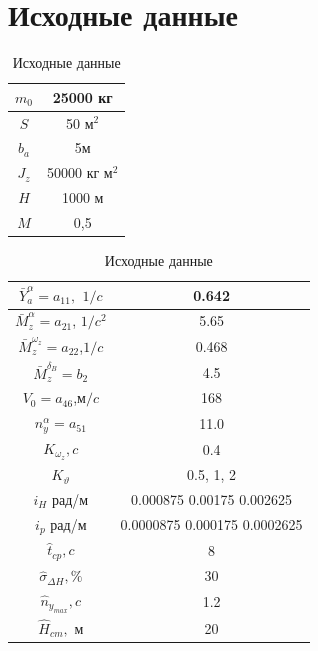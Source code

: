 \documentclass[a4paper,12pt]{article}
\begin{document}
\section{Исходные данные}

    \begin{table}[H]
        \centering
        \caption{Исходные данные}
        \label{tab:Исходные данные 1}
        \begin{tabular}{|c|c|}
        \hline
            $m_0$ & 25000 кг  \\ \hline
            $S$ & 50 м$^2$ \\ \hline
            $b_a$ & 5м  \\ \hline
            $J_z$ & 50000 кг м$^2$ \\ \hline
            $H$ & 1000 м  \\ \hline
            $M$ & 0,5  \\ \hline
        \end{tabular}
    \end{table}
                                
    \begin{table}[H]
        \centering
        \caption{Исходные данные}
        \label{tab:Исходные данные 2}
        \begin{tabular}{|c|c|}
            \hline
            $\bar{Y}_a^\alpha=a_{11},$ $1/c$ &  0.642  \\ \hline
            $\bar{M}_z^{\alpha}=a_{21}$, $1/c^2$ &   5.65 \\ \hline
            $\bar{M}_z^{\omega_z}=a_{22}$,$1/c$ &  0.468 \\ \hline
            $\bar{M}^{\delta_B}_z=b_2$ & 4.5  \\ \hline
            $V_0=a_{46}$,м$/c$ & 168 \\ \hline
            $n_y^\alpha=a_{51}$ &  11.0  \\ \hline
            $K_{\omega_z}, c$ & 0.4 \\ \hline
            $K_\vartheta$  & 0.5, 1, 2  \\ \hline
            $i_H$ рад/м & 0.000875 0.00175 0.002625 \\ \hline
            $i_p$ рад/м & 0.0000875 0.000175 0.0002625 \\ \hline
            $\hat{t}_{cp},c$ & 8 \\ \hline
            $\hat{\sigma}_{\Delta H}, \%$ & 30 \\ \hline
            $\hat{n}_{y_{max}},c$ & 1.2 \\ \hline
            $\hat{H}_{cm},$ м & 20 \\ \hline
            \end{tabular}
    \end{table}
\end{document}
